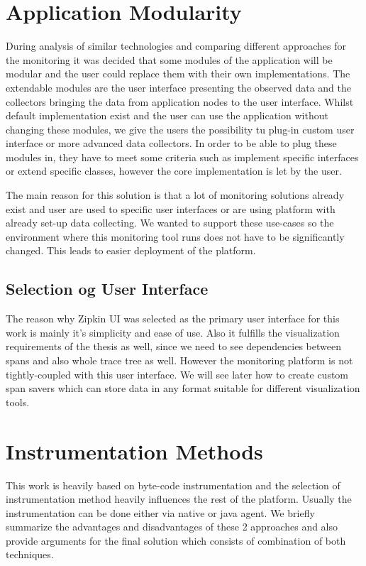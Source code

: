 \section{Application Modularity}
During analysis of similar technologies and comparing different approaches for the monitoring it was decided that some modules of the application will be modular and the user could replace them with their own implementations. The extendable modules are the user interface presenting the observed data and the collectors bringing the data from application nodes to the user interface. Whilst default implementation exist and the user can use the application without changing these modules, we give the users the possibility tu plug-in custom user interface or more advanced data collectors. In order to be able to plug these modules in, they have to meet some criteria such as implement specific interfaces or extend specific classes, however the core implementation is let by the user.

The main reason for this solution is that a lot of monitoring solutions already exist and user are used to specific user interfaces or are using platform with already set-up data collecting. We wanted to support these use-cases so the environment where this monitoring tool runs does not have to be significantly changed. This leads to easier deployment of the platform. 

\subsection{Selection og User Interface}
 The reason why Zipkin UI was selected as the primary user interface for this work is mainly it's simplicity and ease of use. Also it fulfills the visualization requirements of the thesis as well, since we need to see dependencies between spans and also whole trace tree as well. However the monitoring platform is not tightly-coupled with this user interface. We will see later how to create custom span savers which can store data in any format suitable for different visualization tools.
 
\section{Instrumentation Methods}
This work is heavily based on byte-code instrumentation and the selection of instrumentation method heavily influences the rest of the platform. Usually the instrumentation can be done either via native or java agent. We briefly summarize the advantages and disadvantages of these 2 approaches and also provide arguments for the final solution which consists of combination of both techniques. 
